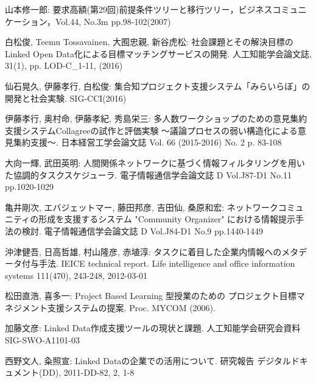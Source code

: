 
\begin{thebibliography}{99}

山本修一郎: 要求高額(第29回)前提条件ツリーと移行ツリー，ビジネスコミュニケーション，Vol.44, No.3m pp.98-102(2007)

白松俊, Teemu Tossavainen, 大囿忠親, 新谷虎松: 社会課題とその解決目標のLinked Open Data化による目標マッチングサービスの開発. 人工知能学会論文誌, 31(1), pp. LOD-C\_1-11, (2016)

仙石晃久, 伊藤孝行, 白松俊: 集合知プロジェクト支援システム「みらいらぼ」の開発と社会実験. SIG-CCI(2016)

伊藤孝行, 奥村命, 伊藤孝紀, 秀島栄三: 多人数ワークショップのための意見集約支援システムCollagreeの試作と評価実験 ～議論プロセスの弱い構造化による意見集約支援～. 日本経営工学会論文誌 Vol. 66 (2015-2016) No. 2 p. 83-108

大向一輝, 武田英明: 人間関係ネットワークに基づく情報フィルタリングを用いた協調的タスクスケジューラ. 電子情報通信学会論文誌 D   Vol.J87-D1   No.11   pp.1020-1029

亀井剛次, エバジェットマー, 藤田邦彦, 吉田仙, 桑原和宏: ネットワークコミュニティの形成を支援するシステム "Community Organizer" における情報提示手法の検討. 電子情報通信学会論文誌 D   Vol.J84-D1   No.9   pp.1440-1449

沖津健吾, 日高哲雄, 村山隆彦, 赤埴淳: タスクに着目した企業内情報へのメタデータ付与手法. IEICE technical report. Life intelligence and office information systems 111(470), 243-248, 2012-03-01

松田直浩, 喜多一: Project Based Learning 型授業のための プロジェクト目標マネジメント支援システムの提案. Proc. MYCOM (2006).

加藤文彦: Linked Data作成支援ツールの現状と課題. 人工知能学会研究会資料SIG-SWO-A1101-03

西野文人, 粂照宣: Linked Dataの企業での活用について. 研究報告 デジタルドキュメント(DD), 2011-DD-82, 2, 1-8

\end{thebibliography}
